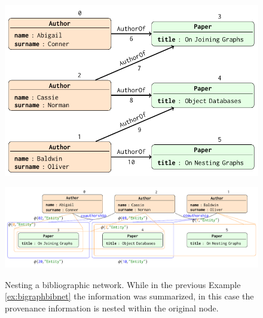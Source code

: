 \begin{figure}[!t]
	\centering
	\begin{minipage}[!t]{0.6\textwidth}
		\centering
		\includegraphics[width=1\textwidth]{fig/06nesting/04bibliography}
		\label{fig:inputbibex2}
	\end{minipage}
\medskip

	\begin{minipage}[!t]{\textwidth}
		\centering
		\includegraphics[width=\textwidth]{fig/06nesting/042nested}
		\label{fig:outputnested}
	\end{minipage}
	\caption{Nesting a bibliographic network. While in the previous Example \vref{ex:bigraphbibnet} the information was summarized, in this case the provenance information is nested within the original node. }
	\label{fig:bibex2}
\end{figure}
